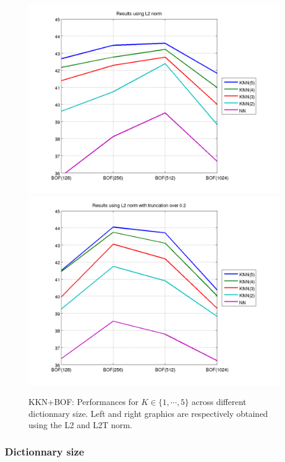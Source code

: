 \documentclass[10pt,a4paper]{llncs}
\begin{document}
\begin{figure}[H]
\centering
\caption{KKN+BOF: Performances for $K \in \{1, \cdots, 5\}$ across different dictionnary size. Left and right graphics are respectively obtained using the L2 and L2T norm.}
\label{fig:KNN_BOF:SIZE_K_graph}
\includegraphics[scale=0.365]{img/KNN_BOF_SIZE_K_graph_L2.png} \hfill
\includegraphics[scale=0.365]{img/KNN_BOF_SIZE_K_graph_L2T.png}
\end{figure}

\subsubsection{Dictionnary size}$~$\\
\end{document}

